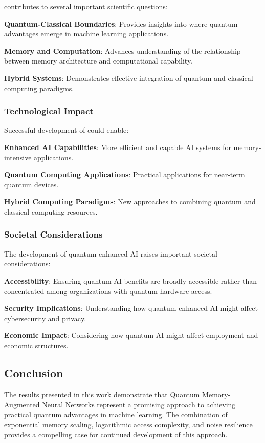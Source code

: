 \qmnn contributes to several important scientific questions:

\textbf{Quantum-Classical Boundaries}: Provides insights into where quantum advantages emerge in machine learning applications.

\textbf{Memory and Computation}: Advances understanding of the relationship between memory architecture and computational capability.

\textbf{Hybrid Systems}: Demonstrates effective integration of quantum and classical computing paradigms.

\subsubsection{Technological Impact}

Successful development of \qmnn could enable:

\textbf{Enhanced AI Capabilities}: More efficient and capable AI systems for memory-intensive applications.

\textbf{Quantum Computing Applications}: Practical applications for near-term quantum devices.

\textbf{Hybrid Computing Paradigms}: New approaches to combining quantum and classical computing resources.

\subsubsection{Societal Considerations}

The development of quantum-enhanced AI raises important societal considerations:

\textbf{Accessibility}: Ensuring quantum AI benefits are broadly accessible rather than concentrated among organizations with quantum hardware access.

\textbf{Security Implications}: Understanding how quantum-enhanced AI might affect cybersecurity and privacy.

\textbf{Economic Impact}: Considering how quantum AI might affect employment and economic structures.

\subsection{Conclusion}

The results presented in this work demonstrate that Quantum Memory-Augmented Neural Networks represent a promising approach to achieving practical quantum advantages in machine learning. The combination of exponential memory scaling, logarithmic access complexity, and noise resilience provides a compelling case for continued development of this approach.

